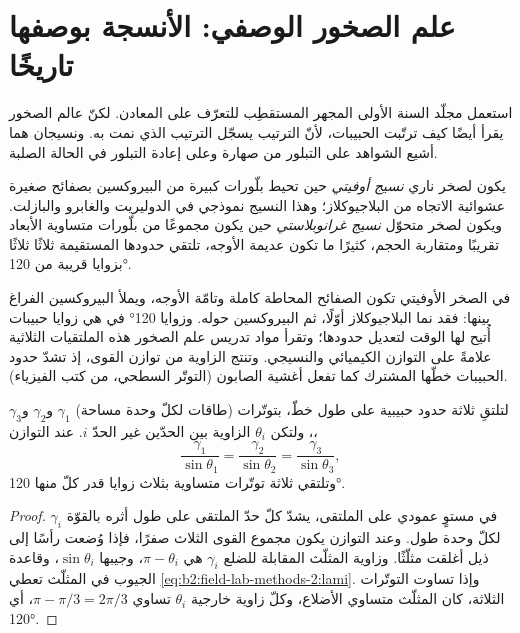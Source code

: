 \section{علم الصخور الوصفي: الأنسجة بوصفها تاريخًا}\label{sec:b2:field-lab-methods-2:petrography}

استعمل مجلّد السنة الأولى المجهر المستقطِب للتعرّف على المعادن. لكنّ عالم الصخور يقرأ أيضًا
كيف ترتّبت الحبيبات، لأنّ الترتيب يسجّل الترتيب الذي نمت به. ونسيجان هما
أشيع الشواهد على التبلور من صهارة وعلى إعادة التبلور في
الحالة الصلبة.

\begin{definition}\label{def:b2:field-lab-methods-2:textures}
يكون لصخر ناري \emph{نسيج أوفيتي} حين تحيط بلّورات كبيرة من البيروكسين
بصفائح صغيرة عشوائية الاتجاه من البلاجيوكلاز؛ وهذا النسيج نموذجي في الدوليريت والغابرو
والبازلت. ويكون لصخر متحوّل \emph{نسيج غرانوبلاستي} حين
يكون مجموعًا من بلّورات متساوية الأبعاد تقريبًا ومتقاربة الحجم، كثيرًا ما تكون عديمة الأوجه،
تلتقي حدودها المستقيمة ثلاثًا ثلاثًا بزوايا قريبة من \ang{120}.
\end{definition}

في الصخر الأوفيتي تكون الصفائح المحاطة كاملة وتامّة الأوجه، ويملأ البيروكسين الفراغ
بينها: فقد نما البلاجيوكلاز أوّلًا، ثم البيروكسين حوله. وزوايا \ang{120} في
 هي زوايا حبيبات أُتيح لها الوقت لتعديل حدودها؛ وتقرأ مواد تدريس علم الصخور هذه الملتقيات
الثلاثية علامةً على التوازن الكيميائي والنسيجي. وتنتج الزاوية من توازن القوى، إذ تشدّ حدود الحبيبات
خطّها المشترك كما تفعل أغشية الصابون (التوتّر السطحي، من كتب الفيزياء).

\begin{proposition}\label{prop:b2:field-lab-methods-2:triple}
لتلتقِ ثلاثة حدود حبيبية على طول خطّ، بتوتّرات (طاقات لكلّ وحدة مساحة) $\gamma_1$
و$\gamma_2$ و$\gamma_3$، ولتكن $\theta_i$ الزاوية بين الحدّين غير
الحدّ $i$. عند التوازن،
\begin{equation}
\frac{\gamma_1}{\sin\theta_1} = \frac{\gamma_2}{\sin\theta_2} = \frac{\gamma_3}{\sin\theta_3},
\label{eq:b2:field-lab-methods-2:lami}
\end{equation}
وتلتقي ثلاثة توتّرات متساوية بثلاث زوايا قدر كلّ منها \ang{120}.
\end{proposition}

\begin{proof}
في مستوٍ عمودي على الملتقى، يشدّ كلّ حدّ الملتقى على طول أثره
بالقوّة $\gamma_i$ لكلّ وحدة طول. وعند التوازن يكون مجموع القوى الثلاث صفرًا، فإذا وُضعت
رأسًا إلى ذيل أغلقت مثلّثًا. وزاوية المثلّث المقابلة للضلع $\gamma_i$ هي
$\pi - \theta_i$، وجيبها $\sin\theta_i$، وقاعدة الجيوب في المثلّث تعطي
\eqref{eq:b2:field-lab-methods-2:lami}. وإذا تساوت التوتّرات الثلاثة، كان المثلّث
متساوي الأضلاع، وكلّ زاوية خارجية $\theta_i$ تساوي $\pi - \pi/3 = 2\pi/3$، أي \ang{120}.
\end{proof}


